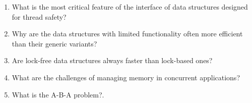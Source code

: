 \begin{enumerate}
\item 
What is the most critical feature of the interface of data structures designed for thread safety?

\item 
Why are the data structures with limited functionality often more efficient than their generic variants?

\item 
Are lock-free data structures always faster than lock-based ones?

\item
What are the challenges of managing memory in concurrent applications?

\item
What is the A-B-A problem?.
\end{enumerate}